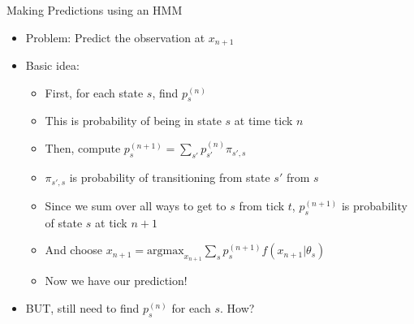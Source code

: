 \documentclass[aspectratio=169]{beamer}
\begin{document}
\begin{frame}{Making Predictions using an HMM}

\begin{itemize}
\item Problem: Predict the observation at $x_{n+1}$

\item  Basic idea:
	\begin{itemize}
	\item First, for each state $s$, find $p^{(n)}_s$
	\item This is probability of being in state $s$ at time tick $n$
	\item Then, compute $p^{(n+1)}_s = \sum_{s'} p^{(n)}_{s'} \pi_{s',s}$
	\item $\pi_{s',s}$ is probability of transitioning from state $s'$ from $s$
	\item Since we sum over all ways to get to $s$ from tick $t$, $p^{(n+1)}_s$ is probability of state $s$ at tick $n+1$
	\item And choose $x_{n+1} = \textrm{argmax}_{x_{n+1}} \sum_s p^{(n+1)}_s f(x_{n+1} | \theta_{s})$
	\item Now we have our prediction!
	\end{itemize}
\item BUT, still need to find $p^{(n)}_s$ for each $s$. How?
\end{itemize}

\end{frame}
\end{document}

